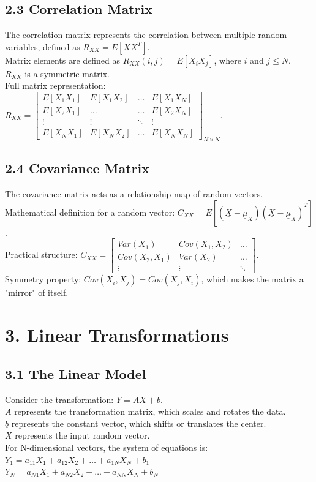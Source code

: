 \documentclass[12pt]{article}
\begin{document}
\subsection*{2.3 Correlation Matrix}
The correlation matrix represents the correlation between multiple random variables, defined as $R_{XX}=E[\underline{X}\underline{X}^{T}]$. \\
Matrix elements are defined as $R_{XX}(i,j)=E[X_{i}X_{j}]$, where $i$ and $j \le N$. \\
$R_{XX}$ is a symmetric matrix. \\
Full matrix representation: $R_{XX} = \begin{bmatrix} E[X_{1}X_{1}] & E[X_{1}X_{2}] & \dots & E[X_{1}X_{N}] \\ E[X_{2}X_{1}] & \dots & \dots & E[X_{2}X_{N}] \\ \vdots & \vdots & \ddots & \vdots \\ E[X_{N}X_{1}] & E[X_{N}X_{2}] & \dots & E[X_{N}X_{N}] \end{bmatrix}_{N \times N}$.

\subsection*{2.4 Covariance Matrix}
The covariance matrix acts as a relationship map of random vectors. \\
Mathematical definition for a random vector: $C_{XX}=E[(\underline{X}-\underline{\mu}_{X})(\underline{X}-\underline{\mu}_{X})^{T}]$. \\
Practical structure: $C_{XX} = \begin{bmatrix} Var(X_{1}) & Cov(X_{1},X_{2}) & \dots \\ Cov(X_{2},X_{1}) & Var(X_{2}) & \dots \\ \vdots & \vdots & \ddots \end{bmatrix}$. \\
Symmetry property: $Cov(X_{i},X_{j})=Cov(X_{j},X_{i})$, which makes the matrix a "mirror" of itself.

\section*{3. Linear Transformations}
\subsection*{3.1 The Linear Model}
Consider the transformation: $\underline{Y}=\underline{A}\underline{X}+\underline{b}$. \\
$\underline{A}$ represents the transformation matrix, which scales and rotates the data. \\
$\underline{b}$ represents the constant vector, which shifts or translates the center. \\
$\underline{X}$ represents the input random vector. \\
For N-dimensional vectors, the system of equations is: \\
$Y_{1}=a_{11}X_{1}+a_{12}X_{2}+\dots+a_{1N}X_{N}+b_{1}$ \\
$Y_{N}=a_{N1}X_{1}+a_{N2}X_{2}+\dots+a_{NN}X_{N}+b_{N}$ 
\end{document}
